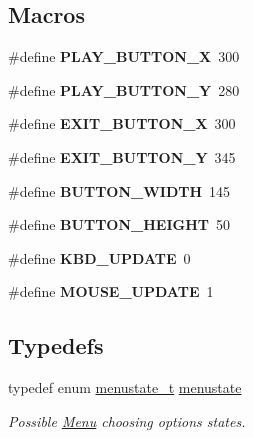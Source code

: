 \subsection*{Macros}
\begin{DoxyCompactItemize}
\item 
\hypertarget{group__menu_ga12b35f2ab601023bd727c783067f2fcb}{}\label{group__menu_ga12b35f2ab601023bd727c783067f2fcb} 
\#define {\bfseries P\+L\+A\+Y\+\_\+\+B\+U\+T\+T\+O\+N\+\_\+X}~300
\item 
\hypertarget{group__menu_ga6c389840e668d04350b29c13c2650a20}{}\label{group__menu_ga6c389840e668d04350b29c13c2650a20} 
\#define {\bfseries P\+L\+A\+Y\+\_\+\+B\+U\+T\+T\+O\+N\+\_\+Y}~280
\item 
\hypertarget{group__menu_gaf1601a7fbbeeb96ec07182255af4a6c0}{}\label{group__menu_gaf1601a7fbbeeb96ec07182255af4a6c0} 
\#define {\bfseries E\+X\+I\+T\+\_\+\+B\+U\+T\+T\+O\+N\+\_\+X}~300
\item 
\hypertarget{group__menu_ga5c2fee47b6e9a8dc63fee2efa67e6cdd}{}\label{group__menu_ga5c2fee47b6e9a8dc63fee2efa67e6cdd} 
\#define {\bfseries E\+X\+I\+T\+\_\+\+B\+U\+T\+T\+O\+N\+\_\+Y}~345
\item 
\hypertarget{group__menu_gae98035e5bee7146fab48f941818a2bc7}{}\label{group__menu_gae98035e5bee7146fab48f941818a2bc7} 
\#define {\bfseries B\+U\+T\+T\+O\+N\+\_\+\+W\+I\+D\+TH}~145
\item 
\hypertarget{group__menu_ga94be6e055d514b19c7cb5f56f492f016}{}\label{group__menu_ga94be6e055d514b19c7cb5f56f492f016} 
\#define {\bfseries B\+U\+T\+T\+O\+N\+\_\+\+H\+E\+I\+G\+HT}~50
\item 
\hypertarget{group__menu_gab595586a4979f7dbe0c656c0d0c1dd4e}{}\label{group__menu_gab595586a4979f7dbe0c656c0d0c1dd4e} 
\#define {\bfseries K\+B\+D\+\_\+\+U\+P\+D\+A\+TE}~0
\item 
\hypertarget{group__menu_ga1fc60683b2a6cb9ab13b140058eec5d0}{}\label{group__menu_ga1fc60683b2a6cb9ab13b140058eec5d0} 
\#define {\bfseries M\+O\+U\+S\+E\+\_\+\+U\+P\+D\+A\+TE}~1
\end{DoxyCompactItemize}
\subsection*{Typedefs}
\begin{DoxyCompactItemize}
\item 
\hypertarget{group__menu_ga187fcd377cc0b403aaec48d4cfdc559a}{}\label{group__menu_ga187fcd377cc0b403aaec48d4cfdc559a} 
typedef enum \hyperlink{group__menu_gafed699a28fc53900e4236f240af3b8c6}{menustate\+\_\+t} \hyperlink{group__menu_ga187fcd377cc0b403aaec48d4cfdc559a}{menustate}
\begin{DoxyCompactList}\small\item\em Possible \hyperlink{struct_menu}{Menu} choosing options\textquotesingle{} states. \end{DoxyCompactList}\end{DoxyCompactItemize}
